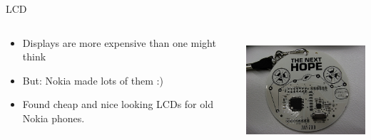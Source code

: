 \documentclass{beamer}
\begin{document}
\begin{frame}{LCD}
  \begin{columns}
    \begin{column}{6cm}
        \begin{itemize}
		\item Displays are more expensive than one might think
		\item But: Nokia made lots of them :)
		\item Found cheap and nice looking LCDs for old Nokia phones.
	\end{itemize}
    \end{column}
    \begin{column}{6cm}
        \includegraphics[height=4cm]{bilder/lcd.jpg}
    \end{column}
  \end{columns}
\end{frame}
\end{document}
